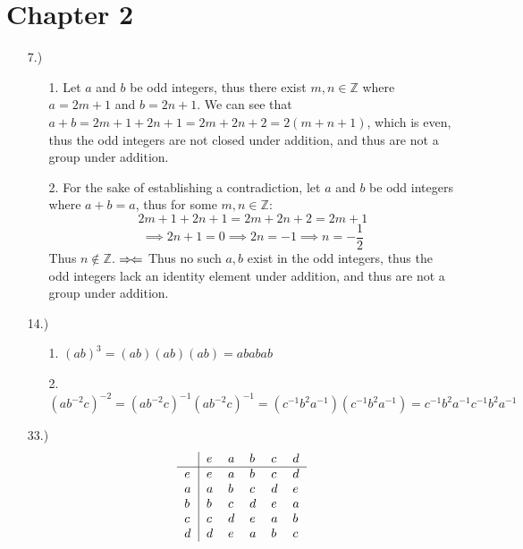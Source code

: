 \documentclass[12pt]{article}
\newcommand{\contradiction}{
    \ensuremath{{\Rightarrow\mspace{-2mu}\Leftarrow}}
}
\newcommand{\Z}{\mathbb{Z}}
\begin{document}
\section*{Chapter 2}
\begin{itemize}
    \item [7.)] \begin{itemize}
        \item [1.] Let $a$ and $b$ be odd integers, thus there exist $m,n\in\Z$ where $a=2m+1$ and $b=2n+1$. We can see that $a+b=2m+1+2n+1=2m+2n+2=2(m+n+1)$, which is even, thus the odd integers are not closed under addition, and thus are not a group under addition.

        \item [2.] For the sake of establishing a contradiction, let $a$ and $b$ be odd integers where $a+b=a$, thus for some $m,n\in\Z$:
        \[2m+1+2n+1=2m+2n+2=2m+1\]
        \[\implies2n+1=0\implies2n=-1\implies n=-\frac{1}{2}\]
        Thus $n\notin\Z$.\contradiction Thus no such $a,b$ exist in the odd integers, thus the odd integers lack an identity element under addition, and thus are not a group under addition.
    \end{itemize}

    \item [14.)] \begin{itemize}
        \item [1.] $(ab)^3=(ab)(ab)(ab)=ababab$

        \item [2.] $(ab^{-2}c)^{-2}=(ab^{-2}c)^{-1}(ab^{-2}c)^{-1}=(c^{-1}b^2a^{-1})(c^{-1}b^2a^{-1})=c^{-1}b^2a^{-1}c^{-1}b^2a^{-1}$
    \end{itemize}

    \item [33.)] \[
        \begin{tabular}{l|lllll}
            & $e$ & $a$ & $b$ & $c$ & $d$ \\
            \hline
            $e$ & $e$ & $a$ & $b$ & $c$ & $d$ \\
            $a$ & $a$ & $b$ & $c$ & $d$ & $e$ \\
            $b$ & $b$ & $c$ & $d$ & $e$ & $a$ \\
            $c$ & $c$ & $d$ & $e$ & $a$ & $b$ \\
            $d$ & $d$ & $e$ & $a$ & $b$ & $c$
        \end{tabular}
        \]

\end{itemize}
\end{document}
